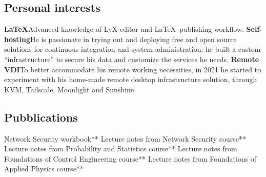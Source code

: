     \subsection{Personal interests}
        {\textbf{LaTeX}}{Advanced knowledge of LyX editor and \LaTeX~publishing workflow.}
        {\textbf{Self-hosting}}{He is passionate in trying out and deploying free and open source solutions for continuous integration and system administration; he built a custom ``infrastructure'' to secure his data and customize the services he needs.}
        {\textbf{Remote VDI}}{To better accommodate his remote working necessities, in 2021 he started to experiment with his home-made remote desktop infrastructure solution, through KVM, Tailscale, Moonlight and Sunshine.}

    \bigskip
    \subsection{Pubblications}
        {Network Security workbook**}
        {Lecture notes from Network Security course**}
        {Lecture notes from Probability and Statistics course**}
        {Lecture notes from Foundations of Control Engineering course**}
        {Lecture notes from Foundations of Applied Physics course**}
